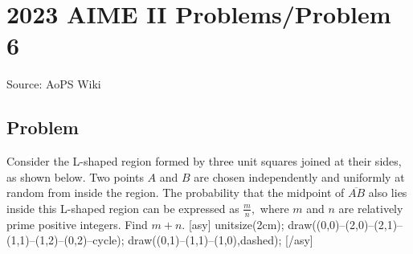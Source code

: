 \documentclass[12pt]{article}
\begin{document}
\section*{{2023 AIME II Problems/Problem 6}}
Source: AoPS Wiki

\subsection*{Problem}
Consider the L-shaped region formed by three unit squares joined at their sides, as shown below. Two points $A$ and $B$ are chosen independently and uniformly at random from inside the region. The probability that the midpoint of $\overline{AB}$ also lies inside this L-shaped region can be expressed as $\frac{m}{n},$ where $m$ and $n$ are relatively prime positive integers. Find $m+n.$ [asy] unitsize(2cm); draw((0,0)--(2,0)--(2,1)--(1,1)--(1,2)--(0,2)--cycle); draw((0,1)--(1,1)--(1,0),dashed); [/asy]
\end{document}
